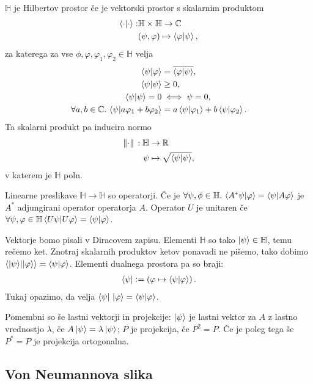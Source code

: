 \documentclass[mat1]{fmfdelo}
\newcommand{\R}{\mathbb R}
\newcommand{\C}{\mathbb C}
\newcommand{\Hb}{\mathbb H}
\newcommand{\defeq}{\vcentcolon=}
\newcommand{\sep}{\ensuremath{.\,}}
\begin{document}
\begin{definicija} \(\Hb\) je Hilbertov prostor če je vektorski prostor s skalarnim produktom
    \begin{align*}
        \braket{\cdot}{\cdot} :& \Hb \times \Hb \to \C\\
        & (\psi, \varphi) \mapsto \braket{\varphi}{\psi},
    \end{align*}
    za katerega za vse \(\phi, \varphi, \varphi_1, \varphi_2 \in \Hb\) velja
    \begin{align*}
        \braket{\psi}{\varphi} &= \overline{\braket{\varphi}{\psi}},\\
        \braket\psi &\geq 0,\\
        \braket\psi = 0 &\iff \psi = 0,\\
        \forall a,b\in\C\sep \braket{\psi}{a\varphi_1 + b\varphi_2} &=a\braket{\psi}{\varphi_1} + b\braket{\psi}{\varphi_2}.
    \end{align*}
    Ta skalarni produkt pa inducira normo
    \begin{align*}
        \norm*{\cdot} : \Hb &\to \R\\
        \psi &\mapsto \sqrt{\braket\psi},
    \end{align*}
    v katerem je \(\Hb\) poln.
\end{definicija}

Linearne preslikave \(\Hb\to\Hb\) so operatorji. Če je \(\forall \psi,\phi\in\Hb\sep\braket{A^*\psi}{\varphi} = \braket{\psi}{A\varphi}\) je \(A^*\) adjungirani operator operatorja \(A\). Operator \(U\) je unitaren če \(\forall \psi,\varphi\in\Hb \braket{U\psi}{U\varphi} = \braket{\psi}{\varphi}\).

Vektorje bomo pisali v Diracovem zapisu. Elementi \(\Hb\) so tako \(\ket{\psi}\in\Hb\), temu rečemo ket. Znotraj skalarnih produktov ketov ponavadi ne pišemo, tako dobimo \(\braket{\ket\psi}{\ket\varphi} = \braket{\psi}{\varphi}\). Elementi dualnega prostora pa so braji:
\begin{align*}
    \bra{\psi} \defeq \left(\varphi \mapsto \braket{\psi}{\varphi} \right).
\end{align*}
Tukaj opazimo, da velja \(\bra{\psi}\, \ket{\varphi} = \braket{\psi}{\varphi}\).

Pomembni so še lastni vektorji in projekcije: \(\ket{\psi}\) je lastni vektor za \(A\) z lastno vrednostjo \(\lambda\), če \(A\ket\psi = \lambda \ket\psi\); \(P\) je projekcija, če \(P^2 = P\). Če je poleg tega še \(P^* = P\) je projekcija ortogonalna.
\subsection{Von Neumannova slika}
\end{document}
